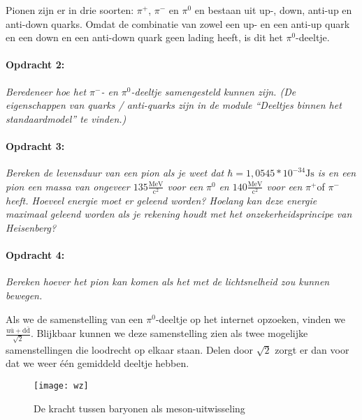 Pionen zijn er in drie soorten: $\pi^{+}$, $\pi^{-}$ en $\pi^{0}$
en bestaan uit up-, down, anti-up en anti-down quarks. Omdat de combinatie
van zowel een up- en een anti-up quark en een down en een anti-down
quark geen lading heeft, is dit het $\pi^{0}$-deeltje.


\paragraph*{Opdracht 2:}

\emph{Beredeneer hoe het $\pi^{-}$- en $\pi^{0}$-deeltje samengesteld
kunnen zijn. (De eigenschappen van quarks / anti-quarks zijn in de
module ``Deeltjes binnen het standaardmodel'' te vinden.) }


\paragraph*{Opdracht 3:}

\emph{Bereken de levensduur van een pion als je weet dat $\hbar=1,0545*10^{-34}\mathrm{Js}$
is en een pion een massa van ongeveer $135\mathrm{\frac{MeV}{c^{2}}}$
voor een }$\pi^{0}$\emph{ en $140\mathrm{\frac{MeV}{c^{2}}}$ voor
een }$\pi^{+}$of $\pi^{-}$\emph{ heeft. Hoeveel energie moet er
geleend worden? Hoelang kan deze energie maximaal geleend worden als
je rekening houdt met het onzekerheidsprincipe van Heisenberg?}


\paragraph*{Opdracht 4:}

\emph{Bereken hoever het pion kan komen als het met de lichtsnelheid
zou kunnen bewegen.}

Als we de samenstelling van een $\pi^{0}$-deeltje op het internet
opzoeken, vinden we $\frac{\mathrm{u\bar{u}+d\bar{d}}}{\sqrt{2}}$.
Blijkbaar kunnen we deze samenstelling zien als twee mogelijke samenstellingen
die loodrecht op elkaar staan. Delen door $\sqrt{2}$ zorgt er dan
voor dat we weer één gemiddeld deeltje hebben.

\begin{figure}[h]
\noindent \begin{centering}
\texttt{[image: wz]}
\par\end{centering}

\caption{De kracht tussen baryonen als meson-uitwisseling}
\end{figure}


